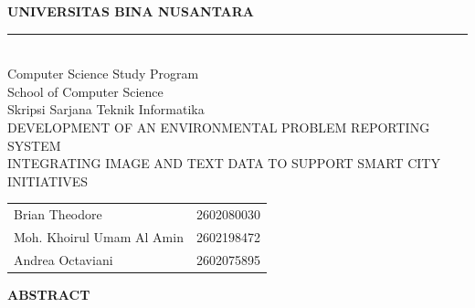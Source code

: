 \clearpage
{}
{}
\thispagestyle{plain}
\vspace*{-1.6cm}

\begin{center}

{\selectfont\bfseries
UNIVERSITAS BINA NUSANTARA\\[0.05cm]
\rule{\textwidth}{0.8pt}\\[0.05cm]

Computer Science Study Program\\
School of Computer Science\\
Skripsi Sarjana Teknik Informatika\\[0.15cm]

DEVELOPMENT OF AN ENVIRONMENTAL PROBLEM REPORTING SYSTEM\\
INTEGRATING IMAGE AND TEXT DATA TO SUPPORT SMART CITY INITIATIVES\\[0.2cm]
}

{\selectfont\bfseries
\begin{tabular}{p{7cm} l}
Brian Theodore & 2602080030 \\[0.05cm]
Moh. Khoirul Umam Al Amin & 2602198472 \\[0.05cm]
Andrea Octaviani & 2602075895
\end{tabular}
}
\end{center}

\vspace{0.15cm}

\begin{center}
{\fontsize{16pt}{18pt}\selectfont\bfseries ABSTRACT}
\end{center}

